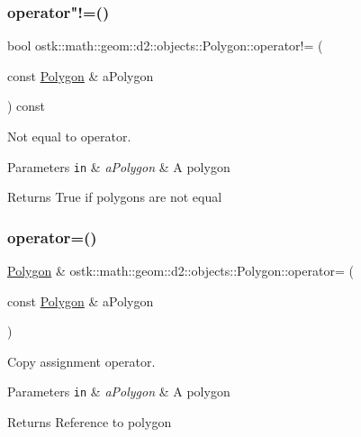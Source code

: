 \subsubsection{\texorpdfstring{operator"!=()}{operator!=()}}
{\footnotesize\ttfamily bool ostk\+::math\+::geom\+::d2\+::objects\+::\+Polygon\+::operator!= (\begin{DoxyParamCaption}\item[{const \hyperlink{classostk_1_1math_1_1geom_1_1d2_1_1objects_1_1_polygon}{Polygon} \&}]{a\+Polygon }\end{DoxyParamCaption}) const}



Not equal to operator. 


\begin{DoxyParams}[1]{Parameters}
\mbox{\tt in}  & {\em a\+Polygon} & A polygon \\
\hline
\end{DoxyParams}
\begin{DoxyReturn}{Returns}
True if polygons are not equal 
\end{DoxyReturn}
\mbox{\label{classostk_1_1math_1_1geom_1_1d2_1_1objects_1_1_polygon_aad1bdf4404a88c3da5c93e12e0cbb241}} 
\subsubsection{\texorpdfstring{operator=()}{operator=()}}
{\footnotesize\ttfamily \hyperlink{classostk_1_1math_1_1geom_1_1d2_1_1objects_1_1_polygon}{Polygon} \& ostk\+::math\+::geom\+::d2\+::objects\+::\+Polygon\+::operator= (\begin{DoxyParamCaption}\item[{const \hyperlink{classostk_1_1math_1_1geom_1_1d2_1_1objects_1_1_polygon}{Polygon} \&}]{a\+Polygon }\end{DoxyParamCaption})}



Copy assignment operator. 


\begin{DoxyParams}[1]{Parameters}
\mbox{\tt in}  & {\em a\+Polygon} & A polygon \\
\hline
\end{DoxyParams}
\begin{DoxyReturn}{Returns}
Reference to polygon 
\end{DoxyReturn}
\mbox{\label{classostk_1_1math_1_1geom_1_1d2_1_1objects_1_1_polygon_a6fa3a2d3811523250bbb916e5d0ff8b9}} 
